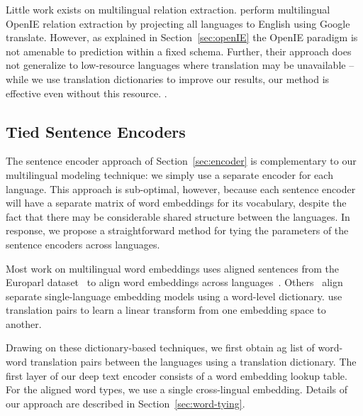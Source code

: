 Little work exists on multilingual relation extraction. \citet{faruqui2015multilingual} perform multilingual OpenIE relation extraction by projecting all languages to English using Google translate. However, as explained in Section~\ref{sec:openIE} the OpenIE paradigm is not amenable to prediction within a fixed schema. Further, their approach does not generalize to low-resource languages where translation may be unavailable -- while we use translation dictionaries to improve our results, our method is effective even without this resource. .



\subsection{Tied Sentence Encoders \label{sec:tie-words}}
The sentence encoder approach of Section~\ref{sec:encoder} is complementary to our multilingual modeling technique: we simply use a separate encoder for each language.  This approach is sub-optimal, however, because each sentence encoder will have a separate matrix of word embeddings for its vocabulary, despite the fact that there may be considerable shared structure between the languages. In response, we propose a straightforward method for tying the parameters of the sentence encoders across languages. 

Most work on multilingual word embeddings uses aligned sentences from the Europarl dataset~\citep{koehn2005europarl} to align word embeddings across languages~\citep{Gouws2015,luong2015bilingual,hermann2014multilingual}. Others~\citep{mikolov2013,faruqui2014retrofitting} align separate single-language embedding models using a word-level dictionary. \citet{mikolov2013} use translation pairs to learn a linear transform from one embedding space to another.

Drawing on these dictionary-based techniques, we first obtain ag list of word-word translation pairs between the languages using a translation dictionary. The first layer of our deep text encoder consists of a word embedding lookup table. For the aligned word types, we use a single cross-lingual embedding. Details of our approach are described in Section~\ref{sec:word-tying}.

